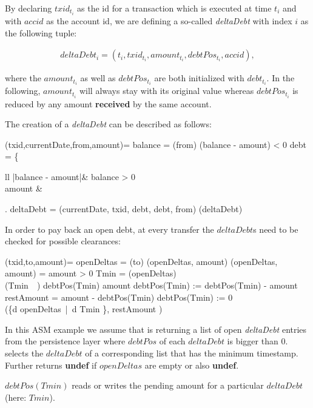 By declaring $txid_{t_i}$ as the id for a transaction which is executed at time $t_i$ and with $accid$ as the account id, we are defining a so-called \textit{deltaDebt} with index $i$ as the following tuple:

\begin{align}
	deltaDebt_i = (t_i, txid_{t_i}, amount_{t_i}, debtPos_{t_i}, accid),
\end{align}

where the $amount_{t_i}$ as well as $debtPos_{t_i}$ are both initialized with $debt_{t_i}$. In the following, $amount_{t_i}$ will always stay with its original value whereas $debtPos_{t_i}$ is reduced by any amount \textbf{received} by the same account.

The creation of a \textit{deltaDebt} can be described as follows:

\begin{asm}
	(txid,currentDate,from,amount)=\+
		\LET balance = (from)\+
			\IF (balance - amount) < 0 \THEN\+
				\LET debt =  \+\left\{\begin{array}{ll}
						|balance - amount|\+& \IF balance > 0\\
						amount & \ELSE
					\end{array}\right.\-\-
				\LET deltaDebt = (currentDate, txid, debt, debt, from)\+
					(deltaDebt)
\end{asm}

In order to pay back an open debt, at every transfer the $deltaDebt$s need to be checked for possible clearances:

\begin{asm}
	(txid,to,amount)=\+
		\LET openDeltas = (to)\+
			(openDeltas, amount)\dec\-
	\WHERE \+
		(openDeltas, amount) =\+
		\IF amount > 0 \THEN\+
			\LET Tmin = (openDeltas)\\
			\IF (Tmin\ \neq\ \UNDEF) \THEN\+
				\IF debtPos(Tmin) \ge amount \THEN\+
					debtPos(Tmin) := debtPos(Tmin) - amount\-
				\ELSE\+
					\LET restAmount = amount - debtPos(Tmin)\+
						debtPos(Tmin) := 0\\
						(\{d \in openDeltas\ |\ d \neq Tmin \}, restAmount )\dec\dec\dec\-
\end{asm}


In this ASM example we assume that  is returning a list of open \textit{deltaDebt} entries from the persistence layer where $debtPos$ of each $deltaDebt$ is bigger than $0$.  selects the $deltaDebt$ of a corresponding list that has the minimum timestamp. Further  returns \textbf{undef} if $openDeltas$ are empty or also \textbf{undef}.

$debtPos(Tmin)$ reads or writes the pending amount for a particular $deltaDebt$ (here: $Tmin$).









